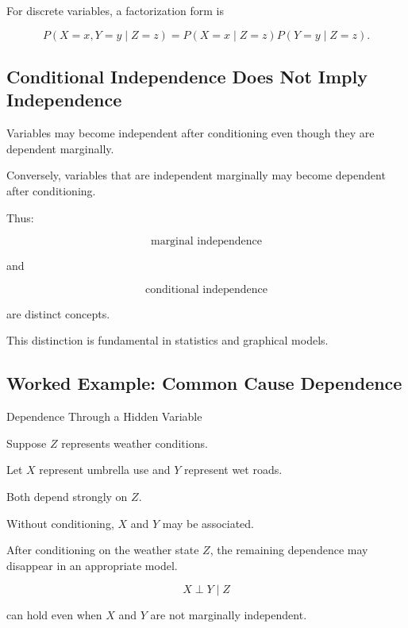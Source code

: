 For discrete variables, a factorization form is

\[
\boxed{
P(X=x,Y=y\mid Z=z)
=
P(X=x\mid Z=z)
P(Y=y\mid Z=z).
}
\]

\subsection{Conditional Independence Does Not Imply Independence}
\label{subsec:conditional-independence-not-independence}

Variables may become independent after conditioning even though they are
dependent marginally.

Conversely, variables that are independent marginally may become
dependent after conditioning.

Thus:

\[
\boxed{
\text{marginal independence}
}
\]

and

\[
\boxed{
\text{conditional independence}
}
\]

are distinct concepts.

This distinction is fundamental in statistics and graphical models.

\subsection{Worked Example: Common Cause Dependence}
\label{subsec:worked-common-cause}

\begin{workedexamplebox}{Dependence Through a Hidden Variable}

Suppose \(Z\) represents weather conditions.

Let \(X\) represent umbrella use and \(Y\) represent wet roads.

Both depend strongly on \(Z\).

Without conditioning, \(X\) and \(Y\) may be associated.

After conditioning on the weather state \(Z\), the remaining dependence
may disappear in an appropriate model.

\begin{answerbox}
\[
\boxed{
X\perp Y\mid Z
}
\]

can hold even when \(X\) and \(Y\) are not marginally independent.
\end{answerbox}

\end{workedexamplebox}

